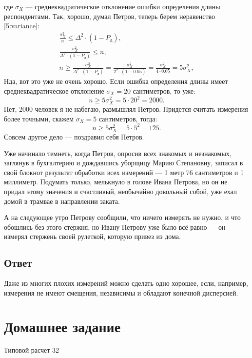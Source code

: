 где $\sigma_X$ --- среднеквадратическое отклонение ошибки определения длины респондентами. Так, хорошо, думал Петров, теперь берем неравенство \eqref{5:variance}:
\begin{gather}
    \frac{\sigma_X^2}{n} \le \Delta^2 \cdot \left ( 1 - P_\text{д} \right ) , \\
    \frac{\sigma_X^2}{\Delta^2 \cdot \left ( 1 - P_\text{д} \right )} \le n , \\
    n \ge \frac{\sigma_X^2}{\Delta^2 \cdot \left ( 1 - P_\text{д} \right )} = \frac{\sigma_X^2}{2^2 \cdot \left ( 1 - 0.95 \right )} = \frac{\sigma_X^2}{4 \cdot 0.05} = 5 \sigma_X^2,
\end{gather}
Нда, вот это уже не очень хорошо. Если ошибка определения длины имеет среднеквадратическое отклонение $\sigma_X = 20$ сантиметров, то уже:
\begin{equation}
    n \ge 5 \sigma_X^2 = 5 \cdot 20^2 = 2000.
\end{equation}
Нет, 2000 человек я не набегаю, размышлял Петров. Придется считать измерения более точными, скажем $\sigma_X = 5$ сантиметров, тогда:
\begin{equation}
    n \ge 5 \sigma_X^2 = 5 \cdot 5^2 = 125.
\end{equation}
Совсем другое дело --- поздравил себя Петров.

Уже начинало темнеть, когда Петров, опросив всех знакомых и незнакомых, заглянув в бухгалтерию и дождавшись уборщицу Марию Степановну, записал в свой блокнот результат
обработки всех измерений --- 1 метр 76 сантиметров и 1 миллиметр. Подумать только, мелькнуло в голове Ивана Петрова, но он не придал этому значения и счастливый, необычайно
довольный собой, уже ехал домой в трамвае в направлении заката.

А на следующее утро Петрову сообщили, что ничего измерять не нужно, и что обошлись без этого стержня, но Ивану Петрову уже было всё равно --- он измерял стержень
своей рулеткой, которую привез из дома.

\subsection*{Ответ}
Даже из многих плохих измерений можно сделать одно хорошее, если, например, измерения не имеют смещения, независимы и обладают конечной дисперсией.


\section{Домашнее задание}
Типовой расчет 32

